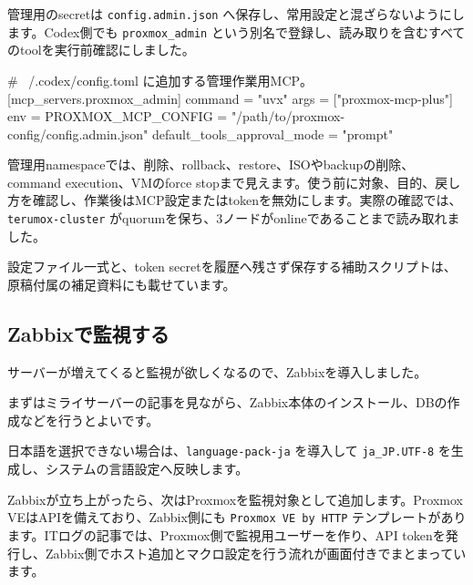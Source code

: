 管理用のsecretは \texttt{config.admin.json} へ保存し、常用設定と混ざらないようにします。Codex側でも \texttt{proxmox\_admin} という別名で登録し、読み取りを含むすべてのtoolを実行前確認にしました。

\begin{commands}
# ~/.codex/config.toml に追加する管理作業用MCP。
[mcp_servers.proxmox_admin]
command = "uvx"
args = ["proxmox-mcp-plus"]
env = { PROXMOX_MCP_CONFIG = "/path/to/proxmox-config/config.admin.json" }
default_tools_approval_mode = "prompt"
\end{commands}

管理用namespaceでは、削除、rollback、restore、ISOやbackupの削除、command execution、VMのforce stopまで見えます。使う前に対象、目的、戻し方を確認し、作業後はMCP設定またはtokenを無効にします。実際の確認では、\texttt{terumox-cluster} がquorumを保ち、3ノードがonlineであることまで読み取れました。

設定ファイル一式と、token secretを履歴へ残さず保存する補助スクリプトは、原稿付属の補足資料にも載せています。


\subsection{Zabbixで監視する}

サーバーが増えてくると監視が欲しくなるので、Zabbixを導入しました。

まずはミライサーバーの記事を見ながら、Zabbix本体のインストール、DBの作成などを行うとよいです\cite{miraiserver-zabbix-ubuntu}。


日本語を選択できない場合は、\texttt{language-pack-ja} を導入して \texttt{ja\_JP.UTF-8} を生成し、システムの言語設定へ反映します。

Zabbixが立ち上がったら、次はProxmoxを監視対象として追加します。Proxmox VEはAPIを備えており、Zabbix側にも \texttt{Proxmox VE by HTTP} テンプレートがあります。ITログの記事では、Proxmox側で監視用ユーザーを作り、API tokenを発行し、Zabbix側でホスト追加とマクロ設定を行う流れが画面付きでまとまっています\cite{filewo-proxmox-zabbix}。



